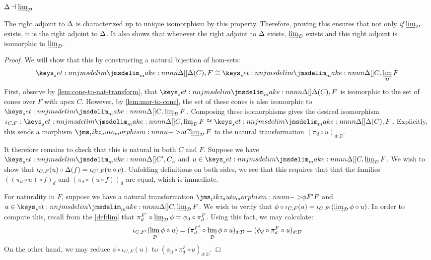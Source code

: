\documentclass{amsart}
\begin{document}
\begin{theorem}
  $\Disc \Adjoint \Lim_\DD$
\end{theorem}
\begin{remark}
  The right adjoint to $\Delta$ is characterized up to unique isomorphism by this
  property. Therefore, proving this ensures that not only \emph{if} $\Lim_\DD$ exists, it is the
  right adjoint to $\Delta$. It also shows that whenever the right adjoint to $\Delta$ exists,
  $\Lim_\DD$ exists and this right adjoint is isomorphic to $\Lim_\DD$.
\end{remark}
\begin{proof}
  We will show that this by constructing a natural bijection of hom-sets:
  \[
    \Hom{\Disc(C)}{F} \cong \Hom{C}{\Lim_\DD F}
  \]
  First, observe by \cref{lem:cone-to-nat-transform}, that $\Hom{\Disc(C)}{F}$ is isomorphic to the
  set of cones over $F$ with apex $C$. However, by \cref{lem:mor-to-cone}, the set of these cones is
  also isomorphic to $\Hom{C}{\Lim_\DD F}$. Composing these isomorphisms gives the desired
  isomorphism $\iota_{C,F} : \Hom{C}{\Lim_\DD F} \cong \Hom{\Disc(C)}{F}$. Explicitly, this sends a
  morphism $\Mor[u]{C}{\Lim_\DD F}$ to the natural transformation $(\pi_d \circ u)_{d : \DD}$.

  It therefore remains to check that this is natural in both $C$ and $F$. Suppose we have
  $\Hom[c]{C'}{C}$ and $u \in \Hom{C}{\Lim_\DD F}$. We wish to show that
  $\iota_{C,F}(u) \circ \Delta(f) = \iota_{C',F}(u \circ c)$. Unfolding definitions on both sides, we
  see that this requires that that the families $((\pi_d \circ u) \circ f)_d$ and
  $(\pi_d \circ (u \circ f))_d$ are equal, which is immediate.

  For naturality in $F$, suppose we have a natural transformation $\Mor[\phi]{F'}{F}$ and
  $u \in \Hom{C}{\Lim_\DD F}$. We wish to verify that
  $\phi \circ \iota_{C,F}(u) = \iota_{C,F'}(\Lim_\DD \phi \circ u)$. In order to compute this,
  recall from the \cref{def:lim} that $\pi_d^{F'} \circ \Lim_\DD \phi = \phi_d \circ \pi_d^F$.
  Using this fact, we may calculate:
  \[
    \iota_{C,F'}(\Lim_\DD \phi \circ u) =
    (\pi_d^{F'} \circ \Lim_\DD \phi \circ u)_{d : \DD} =
    (\phi_d \circ \pi_d^F \circ u)_{d : \DD}
  \]
  On the other hand, we may reduce $\phi \circ \iota_{C,F}(u)$ to
  $(\phi_d \circ \pi_d^F \circ u)_{d : \DD}$.
\end{proof}

\printbibliography
\end{document}
